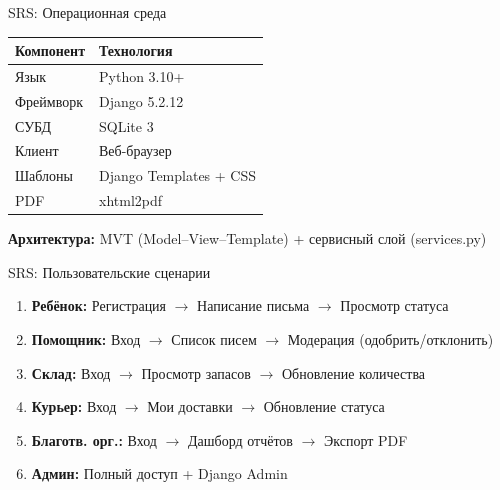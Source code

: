\documentclass[aspectratio=169,14pt]{beamer}
\begin{document}
\begin{frame}{SRS: Операционная среда}
\begin{table}
\small
\begin{tabular}{ll}
\toprule
\textbf{Компонент} & \textbf{Технология} \\
\midrule
Язык & Python 3.10+ \\
Фреймворк & Django 5.2.12 \\
СУБД & SQLite 3 \\
Клиент & Веб-браузер \\
Шаблоны & Django Templates + CSS \\
PDF & xhtml2pdf \\
\bottomrule
\end{tabular}
\end{table}

\vspace{0.3cm}
\textbf{Архитектура:} MVT (Model--View--Template) + сервисный слой (services.py)
\end{frame}

\begin{frame}{SRS: Пользовательские сценарии}
\small
\begin{enumerate}
    \item \textbf{Ребёнок:} Регистрация $\to$ Написание письма $\to$ Просмотр статуса
    \item \textbf{Помощник:} Вход $\to$ Список писем $\to$ Модерация (одобрить/отклонить)
    \item \textbf{Склад:} Вход $\to$ Просмотр запасов $\to$ Обновление количества
    \item \textbf{Курьер:} Вход $\to$ Мои доставки $\to$ Обновление статуса
    \item \textbf{Благотв. орг.:} Вход $\to$ Дашборд отчётов $\to$ Экспорт PDF
    \item \textbf{Админ:} Полный доступ + Django Admin
\end{enumerate}
\end{frame}
\end{document}
